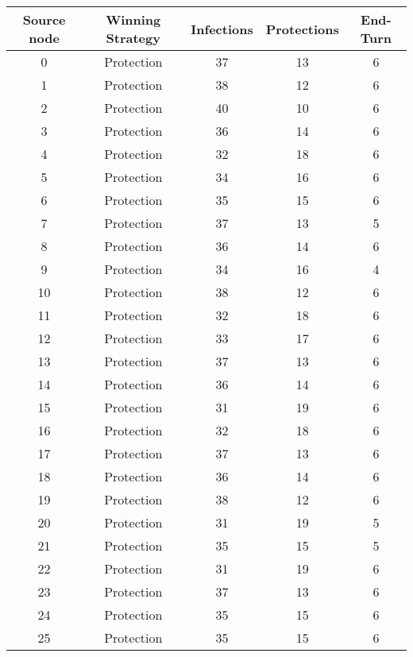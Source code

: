 \documentclass[results.tex]{subfiles}
\begin{document}
\begin{center}
  \begin{tabular}{| c || c | c | c | c |}
    \hline
    {\bfseries Source node} & {\bfseries Winning Strategy} & {\bfseries Infections} & {\bfseries Protections} & {\bfseries End-Turn} \\  %
    \hline\hline
    0 & Protection & 37 & 13 & 6 \\ 
    \hline
    1 & Protection & 38 & 12 & 6 \\ 
    \hline
    2 & Protection & 40 & 10 & 6 \\ 
    \hline
    3 & Protection & 36 & 14 & 6 \\ 
    \hline
    4 & Protection & 32 & 18 & 6 \\ 
    \hline
    5 & Protection & 34 & 16 & 6 \\ 
    \hline
    6 & Protection & 35 & 15 & 6 \\ 
    \hline
    7 & Protection & 37 & 13 & 5 \\ 
    \hline
    8 & Protection & 36 & 14 & 6 \\ 
    \hline
    9 & Protection & 34 & 16 & 4 \\ 
    \hline
    10 & Protection & 38 & 12 & 6 \\ 
    \hline
    11 & Protection & 32 & 18 & 6 \\ 
    \hline
    12 & Protection & 33 & 17 & 6 \\ 
    \hline
    13 & Protection & 37 & 13 & 6 \\ 
    \hline
    14 & Protection & 36 & 14 & 6 \\ 
    \hline
    15 & Protection & 31 & 19 & 6 \\ 
    \hline
    16 & Protection & 32 & 18 & 6 \\ 
    \hline
    17 & Protection & 37 & 13 & 6 \\ 
    \hline
    18 & Protection & 36 & 14 & 6 \\ 
    \hline
    19 & Protection & 38 & 12 & 6 \\ 
    \hline
    20 & Protection & 31 & 19 & 5 \\ 
    \hline
    21 & Protection & 35 & 15 & 5 \\ 
    \hline
    22 & Protection & 31 & 19 & 6 \\ 
    \hline
    23 & Protection & 37 & 13 & 6 \\ 
    \hline
    24 & Protection & 35 & 15 & 6 \\ 
    \hline
    25 & Protection & 35 & 15 & 6 \\ 

\end{tabular}
\end{center}
\end{document}
